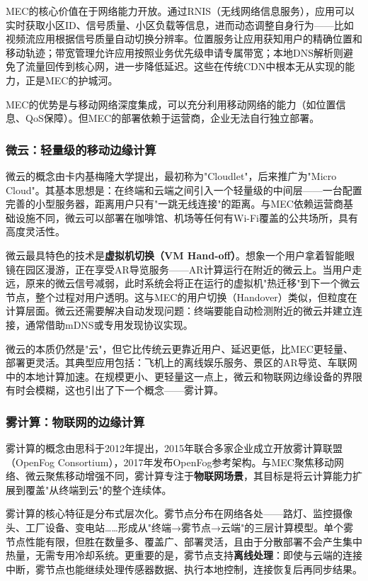 MEC的核心价值在于网络能力开放。通过RNIS（无线网络信息服务），应用可以实时获取小区ID、信号质量、小区负载等信息，进而动态调整自身行为——比如视频流应用根据信号质量自动切换分辨率。位置服务让应用获知用户的精确位置和移动轨迹；带宽管理允许应用按照业务优先级申请专属带宽；本地DNS解析则避免了流量回传到核心网，进一步降低延迟。这些在传统CDN中根本无从实现的能力，正是MEC的护城河。

MEC的优势是与移动网络深度集成，可以充分利用移动网络的能力（如位置信息、QoS保障）。但MEC的部署依赖于运营商，企业无法自行独立部署。

\subsubsection{微云：轻量级的移动边缘计算}

微云的概念由卡内基梅隆大学提出，最初称为"Cloudlet"，后来推广为"Micro Cloud"。其基本思想是：在终端和云端之间引入一个轻量级的中间层——一台配置完善的小型服务器，距离用户只有"一跳无线连接"的距离。与MEC依赖运营商基础设施不同，微云可以部署在咖啡馆、机场等任何有Wi-Fi覆盖的公共场所，具有高度灵活性。

微云最具特色的技术是\textbf{虚拟机切换（VM Hand-off）}。想象一个用户拿着智能眼镜在园区漫游，正在享受AR导览服务——AR计算运行在附近的微云上。当用户走远，原来的微云信号减弱，此时系统会将正在运行的虚拟机"热迁移"到下一个微云节点，整个过程对用户透明。这与MEC的用户切换（Handover）类似，但粒度在计算层面。微云还需要解决自动发现问题：终端要能自动检测附近的微云并建立连接，通常借助mDNS或专用发现协议实现。

微云的本质仍然是"云"，但它比传统云更靠近用户、延迟更低，比MEC更轻量、部署更灵活。其典型应用包括：飞机上的离线娱乐服务、景区的AR导览、车联网中的本地计算加速。在规模更小、更轻量这一点上，微云和物联网边缘设备的界限有时会模糊，这也引出了下一个概念——雾计算。

\subsubsection{雾计算：物联网的边缘计算}

雾计算的概念由思科于2012年提出，2015年联合多家企业成立开放雾计算联盟（OpenFog Consortium），2017年发布OpenFog参考架构。与MEC聚焦移动网络、微云聚焦移动增强不同，雾计算专注于\textbf{物联网场景}，其目标是将云计算能力扩展到覆盖"从终端到云"的整个连续体。

雾计算的核心特征是分布式层次化。雾节点分布在网络各处——路灯、监控摄像头、工厂设备、变电站……形成从"终端→雾节点→云端"的三层计算模型。单个雾节点性能有限，但胜在数量多、覆盖广、部署灵活，且由于分散部署不会产生集中热量，无需专用冷却系统。更重要的是，雾节点支持\textbf{离线处理}：即使与云端的连接中断，雾节点也能继续处理传感器数据、执行本地控制，连接恢复后再同步结果。

